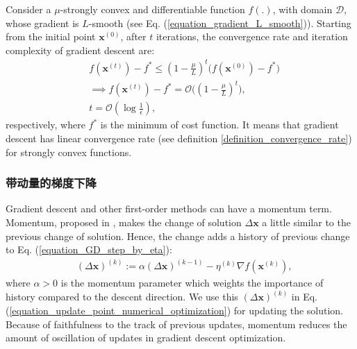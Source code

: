 \documentclass[lang=cn,10pt]{gorgeousnbook}
\numberwithin{equation}{section}%
\numberwithin{figure}{section}%
\begin{document}
\begin{theorem}\label{theorem_GD_convergence_rate_stronglyConvexFunction}
Consider a $\mu$-strongly convex and differentiable function $f(.)$, with domain $\mathcal{D}$, whose gradient is $L$-smooth (see Eq. (\ref{equation_gradient_L_smooth})).
Starting from the initial point $\boldsymbol{x}^{(0)}$, after $t$ iterations, the convergence rate and iteration complexity of gradient descent are:
\begin{align}
&f(\boldsymbol{x}^{(t)}) - f^* \leq (1 - \frac{\mu}{L})^t \big(f(\boldsymbol{x}^{(0)}) - f^*\big) \nonumber \\
&\implies f(\boldsymbol{x}^{(t)}) - f^* = \mathcal{O}\big((1 - \frac{\mu}{L})^t\big), \label{equation_GD_norm_gradient_sublinear_rate_stronglyConvexFunction} \\
&t = \mathcal{O}(\log \frac{1}{\epsilon}), \label{equation_GD_stronglyConvexFunction_iterationComplexity}
\end{align}
respectively, where $f^*$ is the minimum of cost function. 
It means that gradient descent has linear convergence rate (see definition \ref{definition_convergence_rate}) for strongly convex functions. 
\end{theorem}

\subsubsection{带动量的梯度下降}\label{section_momentum}


Gradient descent and other first-order methods can have a momentum term. 
Momentum, proposed in \cite{rumelhart1986learning}, makes the change of solution $\Delta \boldsymbol{x}$ a little similar to the previous change of solution. Hence, the change adds a history of previous change to Eq. (\ref{equation_GD_step_by_eta}):
\begin{align}\label{equation_GD_momentum_update}
&(\Delta \boldsymbol{x})^{(k)} := \alpha (\Delta \boldsymbol{x})^{(k-1)} - \eta^{(k)} \nabla f(\boldsymbol{x}^{(k)}), 
\end{align}
where $\alpha>0$ is the momentum parameter which weights the importance of history compared to the descent direction. We use this $(\Delta \boldsymbol{x})^{(k)}$ in Eq. (\ref{equation_update_point_numerical_optimization}) for updating the solution.
Because of faithfulness to the track of previous updates, momentum reduces the amount of oscillation of updates in gradient descent optimization. 
\end{document}
